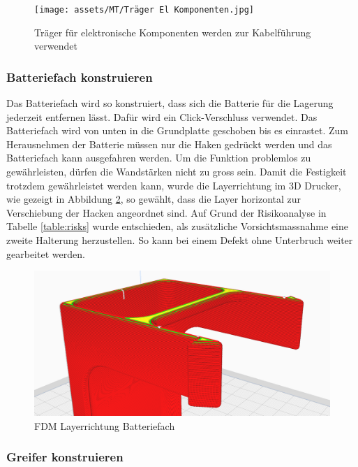 \begin{figure}[H]
\centering
\texttt{[image: assets/MT/Träger El Komponenten.jpg]}
\caption{Träger für elektronische Komponenten werden zur Kabelführung verwendet}
\label{fig: Träger für elektronische Komponenten}
\end{figure}

\subsubsection{Batteriefach konstruieren}
\label{Batteriefach konstruieren}

Das Batteriefach wird so konstruiert, dass sich die Batterie für die Lagerung jederzeit entfernen lässt. Dafür wird ein Click-Verschluss verwendet. Das Batteriefach wird von unten in die Grundplatte geschoben bis es einrastet. Zum Herausnehmen der Batterie müssen nur die Haken gedrückt werden und das Batteriefach kann ausgefahren werden. Um die Funktion problemlos zu gewährleisten, dürfen die Wandstärken nicht zu gross sein. Damit die Festigkeit trotzdem gewährleistet werden kann, wurde die Layerrichtung im 3D Drucker, wie gezeigt in Abbildung \ref{Layerrichtung Batteriefach}, so gewählt, dass die Layer horizontal zur Verschiebung der Hacken angeordnet sind. Auf Grund der Risikoanalyse in Tabelle \ref{table:risks} wurde entschieden, als zusätzliche Vorsichtsmassnahme eine zweite Halterung herzustellen. So kann bei einem Defekt ohne Unterbruch weiter gearbeitet werden.


\begin{figure}[H]
\centering
\includegraphics[width=\textwidth]{assets/MT/Layer_Batterie Fach.png}
\caption{FDM Layerrichtung Batteriefach}
\label{Layerrichtung Batteriefach}
\end{figure}

\subsubsection{Greifer konstruieren}
\label{Greifer konstruieren}

